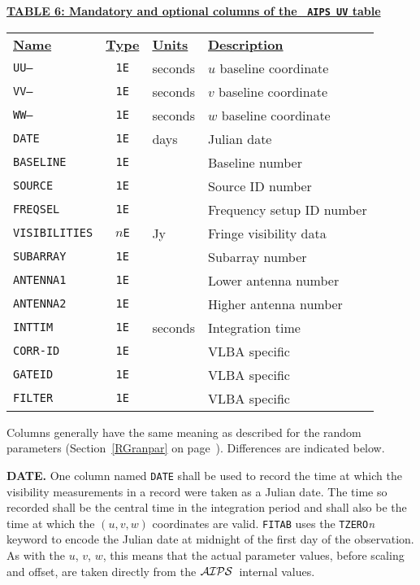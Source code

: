 \documentclass[twoside]{article}
\newcommand{\Hi}[1]{\textcolor{hicol}{#1}}
\newcommand{\AIPS}{{$\cal AIPS\/$}}
\begin{document}
\begin{center}
\underline{\bf{TABLE 6: Mandatory and optional columns of the {\tt
      AIPS UV} table}}\\
\begin{tabular}{lcll}
\noalign{\vspace{2pt}} \label{ta:UVcols}
\underline{{\bf Name\vphantom{y}}} & \underline{\bf{Type}} &
   \underline{{\bf Units\vphantom{y}}} & \underline{\bf{Description}} \\
\noalign{\vspace{2pt}}
{\tt UU--}      & {\tt 1E} & seconds & $u$ baseline coordinate \\
{\tt VV--}      & {\tt 1E} & seconds & $v$ baseline coordinate \\
{\tt WW--}      & {\tt 1E} & seconds & $w$ baseline coordinate \\
{\tt DATE}      & {\tt 1E} & days    & Julian date \\
{\tt BASELINE}  & {\tt 1E} &         & Baseline number \\
{\tt SOURCE}    & {\tt 1E} &         & Source ID number \\
{\tt FREQSEL}   & {\tt 1E} &         & Frequency setup ID number \\
{\tt VISIBILITIES} & {\tt $n$E} & Jy & Fringe visibility data \\
\hline
{\tt \Hi{SUBARRAY}} & {\tt \Hi{\tt 1E}} & & \Hi{Subarray number} \\
{\tt \Hi{ANTENNA1}} & {\tt \Hi{\tt 1E}} & & \Hi{Lower antenna number} \\
{\tt \Hi{ANTENNA2}} & {\tt \Hi{\tt 1E}} & & \Hi{Higher antenna number} \\
{\tt INTTIM}    & {\tt 1E} & seconds & Integration time \\
{\tt CORR-ID}   & {\tt 1E} &         & VLBA specific \\
{\tt GATEID}    & {\tt 1E} &         & VLBA specific \\
{\tt FILTER}    & {\tt 1E} &         & VLBA specific
\end{tabular}
\end{center}

Columns generally have the same meaning as described for the random
parameters (Section~\ref{RGranpar} on page~\pageref{RGranpar}).
Differences are indicated below.

{\bf DATE\@.}  One column named {\tt DATE} shall be used to record the
time at which the visibility measurements in a record were taken as a
Julian date.  The time so recorded shall be the central time in the
integration period and shall also be the time at which the $(u,v,w)$
coordinates are valid.  {\tt FITAB} uses the {\tt TZERO}{\it n}
keyword to encode the Julian date at midnight of the first day of the
observation.  As with the $u$, $v$, $w$, this means that the actual
parameter values, before scaling and offset, are taken directly from
the \AIPS\ internal values.
\end{document}
